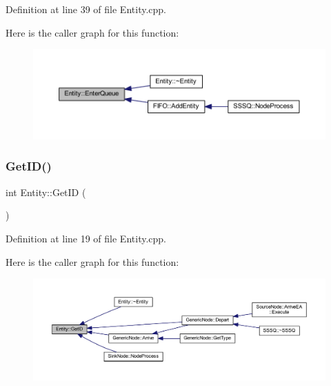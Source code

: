 Definition at line 39 of file Entity.\+cpp.

Here is the caller graph for this function\+:
\nopagebreak
\begin{figure}[H]
\begin{center}
\leavevmode
\includegraphics[width=350pt]{class_entity_a957592ba81c76d59f622a887fee36e8d_icgraph}
\end{center}
\end{figure}
\mbox{\label{class_entity_a8ed56bc59a6c2b0bd01eda3d274a1fac}} 
\subsubsection{\texorpdfstring{Get\+I\+D()}{GetID()}}
{\footnotesize\ttfamily int Entity\+::\+Get\+ID (\begin{DoxyParamCaption}{ }\end{DoxyParamCaption})}



Definition at line 19 of file Entity.\+cpp.

Here is the caller graph for this function\+:
\nopagebreak
\begin{figure}[H]
\begin{center}
\leavevmode
\includegraphics[width=350pt]{class_entity_a8ed56bc59a6c2b0bd01eda3d274a1fac_icgraph}
\end{center}
\end{figure}
\mbox{\label{class_entity_a22d4fe26b229f7720f5204eeadffb1b2}} 
